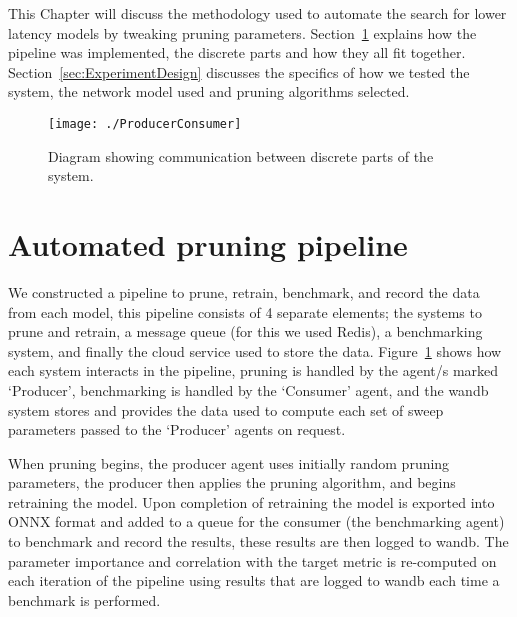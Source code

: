 \documentclass[../Dissertation.tex]{subfiles}
\begin{document}

This Chapter will discuss the methodology used to automate the search for lower latency models by tweaking pruning parameters.
Section~\ref{sec:EngineeringImplementation} explains how the pipeline was implemented, the discrete parts and how they all fit together.
Section~\ref{sec:ExperimentDesign} discusses the specifics of how we tested the system, the network model used and pruning algorithms selected.

\begin{figure}[H]
    \centering
    \texttt{[image: ./ProducerConsumer]}
    \caption{Diagram showing communication between discrete parts of the system.}
    \label{fig:agentCommunication}
\end{figure}

\section{Automated pruning pipeline}\label{sec:EngineeringImplementation}

We constructed a pipeline to prune, retrain, benchmark, and record the data from each model, this pipeline consists of 4 separate elements; the systems to prune and retrain, a message queue  (for this we used Redis), a benchmarking system, and finally the cloud service used to store the data.
Figure~\ref{fig:agentCommunication} shows how each system interacts in the pipeline, pruning is handled by the agent/s marked `Producer', benchmarking is handled by the `Consumer' agent, and the \acrfull{wandb} system stores and provides the data used to compute each set of sweep parameters passed to the `Producer' agents on request.



When pruning begins, the producer agent uses initially random pruning parameters, the producer then applies the pruning algorithm, and begins retraining the model.
Upon completion of retraining the model is exported into ONNX format and added to a queue for the consumer (the benchmarking agent) to benchmark and record the results, these results are then logged to \acrshort{wandb}.
The parameter importance and correlation with the target metric is re-computed on each iteration of the pipeline using results that are logged to \acrshort{wandb} each time a benchmark is performed.
\end{document}
